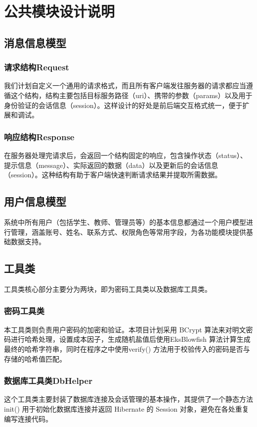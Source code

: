 \ifx\maindoc\undefined
{}
\fi

\section{公共模块设计说明}
\subsection{消息信息模型}
\subsubsection{请求结构Request}
我们计划自定义一个通用的请求格式，而且所有客户端发往服务器的请求都应当遵循这个结构，结构主要包括目标服务路径（uri）、携带的参数（params）以及用于身份验证的会话信息（session）。这样设计的好处是前后端交互格式统一，便于扩展和调试。
\subsubsection{响应结构Response}
在服务器处理完请求后，会返回一个结构固定的响应，包含操作状态（status）、提示信息（message）、实际返回的数据（data）以及更新后的会话信息（session）。这种结构有助于客户端快速判断请求结果并提取所需数据。
\subsection{用户信息模型}
系统中所有用户（包括学生、教师、管理员等）的基本信息都通过一个用户模型进行管理，涵盖账号、姓名、联系方式、权限角色等常用字段，为各功能模块提供基础数据支持。
\subsection{工具类}
工具类核心部分主要分为两块，即为密码工具类以及数据库工具类。
\subsubsection{密码工具类}
本工具类则负责用户密码的加密和验证。本项目计划采用  BCrypt 算法来对明文密码进行哈希处理，设置成本因子，生成随机盐值后使用EksBlowfish 算法计算生成最终的哈希字符串，同时在程序之中使用verify() 方法用于校验传入的密码是否与存储的哈希值匹配。
\subsubsection{数据库工具类DbHelper}
这个工具类主要封装了数据库连接及会话管理的基本操作，其提供了一个静态方法 init() 用于初始化数据库连接并返回 Hibernate 的 Session 对象，避免在各处重复编写连接代码。


